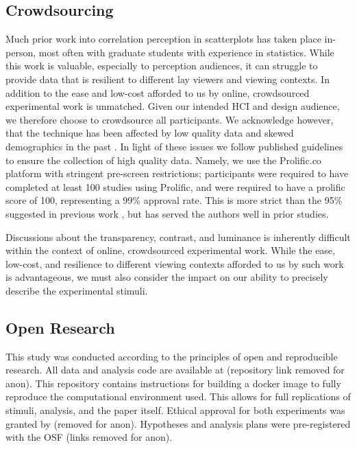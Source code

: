 \documentclass[manuscript, review, anonymous, screen]{acmart}
\begin{document}
\hypertarget{sec-crowdsourcing}{%
\subsection{Crowdsourcing}\label{sec-crowdsourcing}}

Much prior work into correlation perception in scatterplots has taken
place in-person, most often with graduate students with experience in
statistics. While this work is valuable, especially to perception
audiences, it can struggle to provide data that is resilient to
different lay viewers and viewing contexts. In addition to the ease and
low-cost afforded to us by online, crowdsourced experimental work is
unmatched. Given our intended HCI and design audience, we therefore
choose to crowdsource all participants. We acknowledge however, that the
technique has been affected by low quality data and skewed demographics
in the past \citep{chmielewski_2020, charalambides_2021, peer_2021}. In
light of these issues we follow published guidelines \citep{peer_2021}
to ensure the collection of high quality data. Namely, we use the
Prolific.co platform \citep{prolific} with stringent pre-screen
restrictions; participants were required to have completed at least 100
studies using Prolific, and were required to have a prolific score of
100, representing a 99\% approval rate. This is more strict than the
95\% suggested in previous work \citep{peer_2021}, but has served the
authors well in prior studies.

Discussions about the transparency, contrast, and luminance is
inherently difficult within the context of online, crowdsourced
experimental work. While the ease, low-cost, and resilience to different
viewing contexts afforded to us by such work is advantageous, we must
also consider the impact on our ability to precisely describe the
experimental stimuli.

\hypertarget{sec-open-research}{%
\subsection{Open Research}\label{sec-open-research}}

This study was conducted according to the principles of open and
reproducible research. All data and analysis code are available at
(repository link removed for anon). This repository contains
instructions for building a docker image to fully reproduce the
computational environment used. This allows for full replications of
stimuli, analysis, and the paper itself. Ethical approval for both
experiments was granted by (removed for anon). Hypotheses and analysis
plans were pre-registered with the OSF (links removed for anon).
\end{document}
